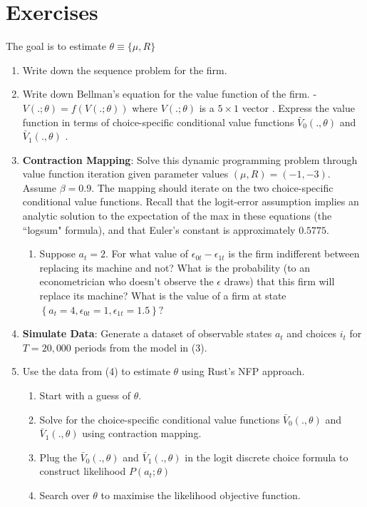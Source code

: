 \documentclass[11pt ]{article}
\begin{document}
\section{Exercises}
The goal is to estimate $\theta \equiv \{\mu, R\}$
\begin{enumerate}
        \item  Write down the sequence problem for the firm.
        \item  Write down Bellman's equation for the value function of the firm. - $V(.; \theta) = f(V(.; \theta))$ where $V(.; \theta)$ is a $5 \times 1$ vector . Express the value function in terms of choice-specific conditional value functions $\bar V_0(.,\theta)$ and $\bar V_1(.,\theta)$ . 
        \item \textbf{Contraction Mapping}: Solve this dynamic programming problem through value function iteration given parameter values $(\mu, R)=(-1,-3)$. Assume $\beta=0.9$. The mapping should iterate on the two choice-specific conditional value functions. Recall that the logit-error assumption implies an analytic solution to the expectation of the max in these equations (the ``logsum" formula), and that Euler's constant is approximately $0.5775$.
        \begin{enumerate}
                \item Suppose $a_{t}=2$. For what value of $\epsilon_{0 t}-\epsilon_{1 t}$ is the firm indifferent between replacing its machine and not? What is the probability (to an econometrician who doesn't observe the $\epsilon$ draws) that this firm will replace its machine? What is the value of a firm at state $\left\{a_{t}=4, \epsilon_{0 t}=1, \epsilon_{1 t}=1.5\right\} ?$
        \end{enumerate}
        \item \textbf{Simulate Data}: Generate a dataset of observable states $a_t$ and choices $i_t$ for $T=20,000$ periods from the model in (3). 
        
        \item Use the data from (4) to estimate $\theta$ using Rust's NFP approach.
        \begin{enumerate}
                \item Start with a guess of $\theta$. 
                \item Solve for the choice-specific conditional value functions $\bar V_0(.,\theta)$ and $\bar V_1(.,\theta)$ using contraction mapping. 
                \item Plug the $\bar V_0(.,\theta)$ and $\bar V_1(.,\theta)$ in the logit discrete choice formula to construct likelihood $P(a_t; \theta)$
                \item Search over $\theta$ to maximise the likelihood objective function. 
        \end{enumerate}
        

\end{enumerate}
\end{document}
